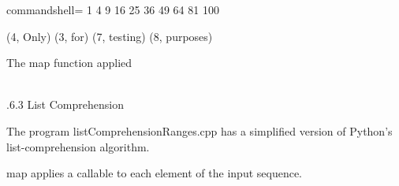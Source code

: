\begin{tcblisting}{commandshell={}}
1 4 9 16 25 36 49 64 81 100

(4, Only) (3, for) (7, testing) (8, purposes)
\end{tcblisting}

\begin{center}
The map function applied
\end{center}

\hspace*{\fill} \\ %
.6.3\hspace{0.2cm} List Comprehension

The program listComprehensionRanges.cpp has a simplified version of Python’s list-comprehension algorithm.

map applies a callable to each element of the input sequence.

